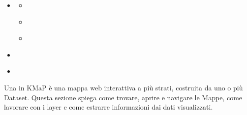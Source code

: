 \documentclass[letterpaper,10pt,english]{sphinxmanual}
\begin{document}
\begin{sphinxcontents}
\begin{itemize}
\begin{itemize}
\item {} 
\sphinxAtStartPar
{}\label{\detokenize{it/04_esplorare_mappe:id18}}{\hyperref[\detokenize{it/04_esplorare_mappe:misurazione-dell-area}]{}}

\end{itemize}

\item {} 
\sphinxAtStartPar
{}\label{\detokenize{it/04_esplorare_mappe:id19}}{\hyperref[\detokenize{it/04_esplorare_mappe:stampare-ed-esportare-la-vista-mappa}]{}}
\begin{itemize}
\item {} 
\sphinxAtStartPar
{}\label{\detokenize{it/04_esplorare_mappe:id20}}{\hyperref[\detokenize{it/04_esplorare_mappe:stampa}]{}}

\item {} 
\sphinxAtStartPar
{}\label{\detokenize{it/04_esplorare_mappe:id21}}{\hyperref[\detokenize{it/04_esplorare_mappe:condividi-permalink}]{}}

\item {} 
\sphinxAtStartPar
{}\label{\detokenize{it/04_esplorare_mappe:id22}}{\hyperref[\detokenize{it/04_esplorare_mappe:incorpora}]{}}

\end{itemize}

\item {} 
\sphinxAtStartPar
{}\label{\detokenize{it/04_esplorare_mappe:id23}}{\hyperref[\detokenize{it/04_esplorare_mappe:salvare-le-modifiche-a-una-mappa}]{}}

\item {} 
\sphinxAtStartPar
{}\label{\detokenize{it/04_esplorare_mappe:id24}}{\hyperref[\detokenize{it/04_esplorare_mappe:creare-una-nuova-mappa}]{}}

\end{itemize}
\end{sphinxcontents}

\sphinxAtStartPar
Una  in KMaP è una mappa web interattiva a più strati, costruita da uno o più
Dataset. Questa sezione spiega come trovare, aprire e navigare le Mappe, come lavorare
con i layer e come estrarre informazioni dai dati visualizzati.
\end{document}
